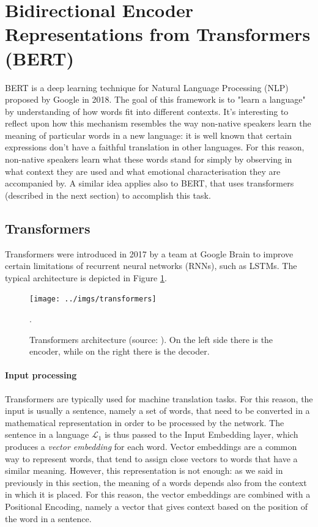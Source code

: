 \documentclass[12pt,a4paper]{book}
\theoremstyle{definition}
\begin{document}
	\section{Bidirectional Encoder Representations from Transformers (BERT)}
	BERT \cite{Devlin2018} is a deep learning technique for Natural Language Processing (NLP) proposed by Google in 2018. The goal of this framework is to "learn a language" by understanding of how words fit into different contexts. It's interesting to reflect upon how this mechanism resembles the way non-native speakers learn the meaning of particular words in a new language: it is well known that certain expressions don't have a faithful translation in other languages. For this reason, non-native speakers learn what these words stand for simply by observing in what context they are used and what emotional characterisation they are accompanied by. A similar idea applies also to BERT, that uses transformers (described in the next section) to accomplish this task.
	
	\subsection{Transformers}
	Transformers \cite{Vaswani2017} were introduced in 2017 by a team at Google Brain to improve certain limitations of recurrent neural networks (RNNs), such as LSTMs. The typical architecture is depicted in Figure \ref{fig:transformer}.
	\begin{figure}[!ht]
		\centering
		\texttt{[image: ../imgs/transformers]}
		\captionsetup{width=.7\linewidth}
		\caption{Transformers architecture (source: \cite{Vaswani2017}). On the left side there is the encoder, while on the right there is the decoder.}
		\label{fig:transformer}.
	\end{figure}
	
	\paragraph{Input processing}
	Transformers are typically used for machine translation tasks. For this reason, the input is usually a sentence, namely a set of words, that need to be converted in a mathematical representation in order to be processed by the network. The sentence in a language $\mathcal{L}_1$ is thus passed to the Input Embedding layer, which produces a \textit{vector embedding} for each word. Vector embeddings are a common way to represent words, that tend to assign close vectors to words that have a similar meaning. However, this representation is not enough: as we said in previously in this section, the meaning of a words depends also from the context in which it is placed. For this reason, the vector embeddings are combined with a Positional Encoding, namely a vector that gives context based on the position of the word in a sentence. 
	
\end{document}
